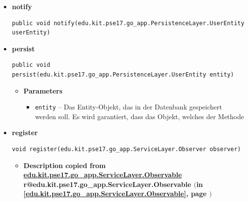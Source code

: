 \documentclass[11pt,a4paper]{report}
\makeatletter
\newcommand{\refdefined}[1]{
\expandafter\ifx\csname r@#1\endcsname\relax
\relax\else
{$($in \ref{#1}, page \pageref{#1}$)$}\fi}
\makeatother
\begin{document}
{{{{{{{{{{{{{{{\begin{itemize}
{\begin{itemize}
{}%
\end{itemize}
}%
\item{ 
\hypertarget{edu.kit.pse17.go_app.PersistenceLayer.daos.UserDaoImp.notify(edu.kit.pse17.go_app.PersistenceLayer.UserEntity)}{{\bf  notify}\\}
\begin{lstlisting}[frame=none]
public void notify(edu.kit.pse17.go_app.PersistenceLayer.UserEntity userEntity)\end{lstlisting} %
}%
\item{ 
\hypertarget{edu.kit.pse17.go_app.PersistenceLayer.daos.UserDaoImp.persist(edu.kit.pse17.go_app.PersistenceLayer.UserEntity)}{{\bf  persist}\\}
\begin{lstlisting}[frame=none]
public void persist(edu.kit.pse17.go_app.PersistenceLayer.UserEntity entity)\end{lstlisting} %
\begin{itemize}
\item{
{\bf  Parameters}
  \begin{itemize}
   \item{
\texttt{entity} -- Das Entity-Objekt, das in der Datenbank gespeichert werden soll. Es wird garantiert, dass das Objekt, welches der Methode}
  \end{itemize}
}%
\end{itemize}
}%
\item{ 
\hypertarget{edu.kit.pse17.go_app.PersistenceLayer.daos.UserDaoImp.register(edu.kit.pse17.go_app.ServiceLayer.Observer)}{{\bf  register}\\}
\begin{lstlisting}[frame=none]
void register(edu.kit.pse17.go_app.ServiceLayer.Observer observer)\end{lstlisting} %
\begin{itemize}
\item{
{\bf  Description copied from \hyperlink{edu.kit.pse17.go_app.ServiceLayer.Observable}{edu.kit.pse17.go_app.ServiceLayer.Observable}{\small \refdefined{edu.kit.pse17.go_app.ServiceLayer.Observable}} }

}
\end{itemize}}
\end{itemize}}}}}}}}}}}}}}}}
\end{document}
